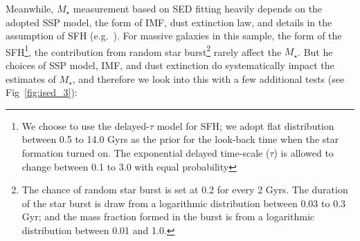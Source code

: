 \documentclass[a4paper,fleqn,usenatbib]{mnras}
\def\mstar{{$M_{\star}$}}
\begin{document}
    Meanwhile, \mstar{} measurement based on SED fitting heavily depends on the 
    adopted SSP model, the form of IMF, dust extinction law, and details in 
    the assumption of SFH (e.g.\ \citealt{Bernardi2017}). 
    For massive galaxies in this sample, the form of the SFH\footnote{We choose 
    to use the delayed-$\tau$ model for SFH; we adopt flat distribution between 
    0.5 to 14.0 Gyrs as the prior for the look-back time when the star formation 
    turned on. 
    The exponential delayed time-scale ($\tau$) is allowed to change between 
    0.1 to 3.0 with equal probability}, the contribution from random star 
    burst\footnote{The chance of random star burst is set at 0.2 for every 2 Gyrs. 
    The duration of the star burst is draw from a logarithmic distribution 
    between 0.03 to 0.3 Gyr; and the mass fraction formed in the burst is from 
    a logarithmic distribution between 0.01 and 1.0.} rarely affect the \mstar{}. 
    But he choices of SSP model, IMF, and dust extinction do systematically impact
    the estimates of \mstar{}, and therefore we look into this with a few 
    additional tests (see Fig~\ref{fig:ised_3}):
\end{document}
